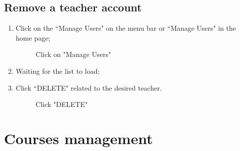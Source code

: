 \documentclass[ManualeUtente]{subfiles}
\begin{document}
\subsection{Remove a teacher account}
\begin{enumerate}
	\item Click on the \textquotedblleft Manage Users" on the menu bar or \textquotedblleft Manage Users" in the home page;
	\begin{figure}[H]
		\centering
		\caption{Click on "Manage Users"}
		\label{fig:Click on "Manage Users"}
	\end{figure}
	\item Waiting for the list to load;
	\item Click \textquotedblleft DELETE" related to the desired teacher.
	\begin{figure}[H]
		\centering
		\caption{Click "DELETE"}
		\label{fig:Click "DELETE"}
	\end{figure}
\end{enumerate}


\section{Courses management}
\end{document}
